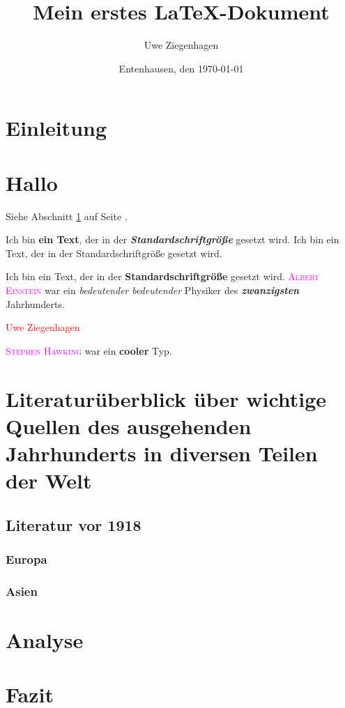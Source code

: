 \documentclass[12pt,ngerman, parskip=half]{scrartcl}
\author{Uwe Ziegenhagen}
\title{Mein erstes LaTeX-Dokument}
\date{Entenhausen, den \today}
\newcommand{\person}[1]{\textcolor{magenta}{\textsc{#1}}}
\renewcommand{\emph}[1]{\textbf{#1}}
\newcommand{\betonen}[1]{\textbf\textit{{#1}}}
\begin{document}
\maketitle

\tableofcontents

\section{Einleitung}\label{sec:einleitung}


\section*{Hallo} %

\blindtext

Siehe Abschnitt \ref{sec:einleitung} auf Seite \pageref{sec:einleitung}.

Ich bin \emph{ein Text}, der in der \betonen{Standardschriftgröße} gesetzt wird. Ich bin ein Text, der in der Standardschriftgröße gesetzt wird.

Ich bin ein Text, der in der \textbf{Standardschriftgröße} gesetzt wird. \person{Albert Einstein} war ein \textit{bedeutender} \textsl{bedeutender}  Physiker des \textit{\textbf{zwanzigsten}} Jahrhunderts.

\textcolor{red}{Uwe Ziegenhagen}

\person{Stephen Hawking}  war ein \emph{cooler} Typ.

\section[Literatur]{Literaturüberblick über wichtige Quellen des ausgehenden Jahrhunderts in diversen Teilen der Welt}


\subsection{Literatur vor 1918}
\subsubsection{Europa}

\blindtext[2]

\subsubsection{Asien}

\blindtext[2]


\section{Analyse}

\blindtext[2]

\section{Fazit}

\blindtext[2]
\end{document}

